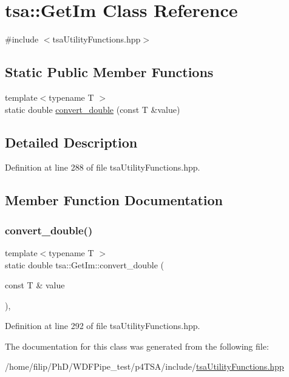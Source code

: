 \hypertarget{classtsa_1_1_get_im}{}\section{tsa\+:\+:Get\+Im Class Reference}
\label{classtsa_1_1_get_im}


{\ttfamily \#include $<$tsa\+Utility\+Functions.\+hpp$>$}

\subsection*{Static Public Member Functions}
\begin{DoxyCompactItemize}
\item 
{\footnotesize template$<$typename T $>$ }\\static double \hyperlink{classtsa_1_1_get_im_a73cc32f20ed67dc84b56ed96f6a58750}{convert\+\_\+double} (const T \&value)
\end{DoxyCompactItemize}


\subsection{Detailed Description}


Definition at line 288 of file tsa\+Utility\+Functions.\+hpp.



\subsection{Member Function Documentation}
\mbox{\label{classtsa_1_1_get_im_a73cc32f20ed67dc84b56ed96f6a58750}} 
\subsubsection{\texorpdfstring{convert\+\_\+double()}{convert\_double()}}
{\footnotesize\ttfamily template$<$typename T $>$ \\
static double tsa\+::\+Get\+Im\+::convert\+\_\+double (\begin{DoxyParamCaption}\item[{const T \&}]{value }\end{DoxyParamCaption})\hspace{0.3cm}{\ttfamily [inline]}, {\ttfamily [static]}}



Definition at line 292 of file tsa\+Utility\+Functions.\+hpp.



The documentation for this class was generated from the following file\+:\begin{DoxyCompactItemize}
\item 
/home/filip/\+Ph\+D/\+W\+D\+F\+Pipe\+\_\+test/p4\+T\+S\+A/include/\hyperlink{tsa_utility_functions_8hpp}{tsa\+Utility\+Functions.\+hpp}\end{DoxyCompactItemize}
